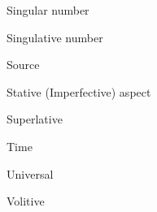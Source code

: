 \documentclass[grammar]{subfiles}
\begin{document}
\begin{multicols*}{2}
\begin{description}[font=\normalfont\scshape,labelindent=12pt,leftmargin=60pt,style=sameline]
			\item[sg] Singular number 
			\item[sgv] Singulative number 
			\item[src] Source 
			\item[stat] Stative (Imperfective) aspect 
			\item[supl] Superlative 
			\item[time] Time 
			\item[univ] Universal 
			\item[vol] Volitive 
		\end{description}
	\end{multicols*}\normalsize
\end{document}
